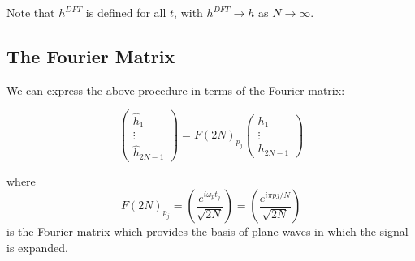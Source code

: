 \documentclass{../../physics_notes}
\begin{document}
Note that $h^{DFT}$ is defined for all $t$, with $h^{DFT} \to h$ as $N\to\infty$.

\subsection{The Fourier Matrix}

We can express the above procedure in terms of the Fourier matrix:

\begin{equation*}
\begin{pmatrix} \hat{h}_1 \\ \vdots \\ \hat{h}_{2N-1} \end{pmatrix} = F(2N)_{p_j} \begin{pmatrix} h_1 \\ \vdots \\ h_{2N-1} \end{pmatrix}
\end{equation*}

where
\begin{equation}
F(2N)_{p_j} = \left(\frac{e^{i\omega_p t_j}}{\sqrt{2N}}\right) = \left(\frac{e^{i\pi p j/N}}{\sqrt{2N}}\right)
\end{equation}
is the Fourier matrix which provides the basis of plane waves in which the signal is expanded.
\end{document}
